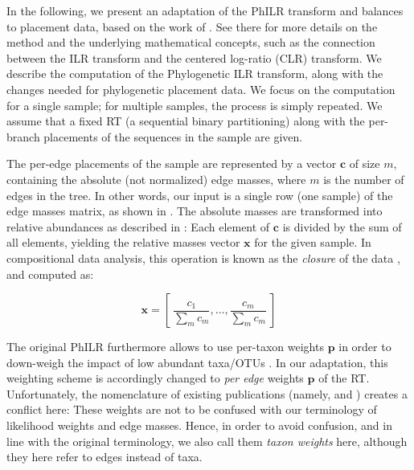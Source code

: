 
In the following, we present an adaptation of the PhILR transform and balances to placement data,
based on the work of .
See there for more details on the method and the underlying mathematical concepts,
such as the connection between the ILR transform and the centered log-ratio (CLR) transform.
We describe the computation of the Phylogenetic ILR transform,
along with the changes needed for phylogenetic placement data.
We focus on the computation for a single sample;
for multiple samples, the process is simply repeated.
We assume that a fixed \acf{RT} (a sequential binary partitioning)
along with the per-branch placements of the sequences in the sample are given.

The per-edge placements of the sample are represented by a vector $\bm{c}$ of size $m$, 
containing the absolute (not normalized) edge masses, where $m$ is the number of edges in the tree.
In other words, our input is a single row (one sample)
of the edge masses matrix, as shown in . %
The absolute masses are transformed into relative abundances as described in %
:
Each element of $\bm{c}$ is divided by the sum of all elements,
yielding the relative masses vector $\bm{x}$ for the given sample.
In compositional data analysis, this operation is known as the \emph{closure} of the data \cite{Aitchison1986}, and computed as:

\begin{equation}
    \label{ch:Balances:sec:Methods:eq:Closure}
    \bm{x} = \left[~ \frac{c_1}{\sum_m c_m}, \dots, \frac{c_m}{\sum_m c_m} ~\right]
\end{equation}

The original PhILR furthermore allows to use per-taxon weights $\bm{p}$
in order to down-weigh the impact of low abundant taxa/OTUs \cite{Egozcue2016,Silverman2017}.
In our adaptation, this weighting scheme is accordingly changed to \emph{per edge} weights $\bm{p}$ of the \ac{RT}.
Unfortunately, the nomenclature of existing publications
(namely,  and ) creates a conflict here:
These weights are not to be confused with our terminology of likelihood weights and edge masses.
Hence, in order to avoid confusion, and in line with the original terminology,
we also call them \emph{taxon weights} here, although they here refer to edges instead of taxa.

